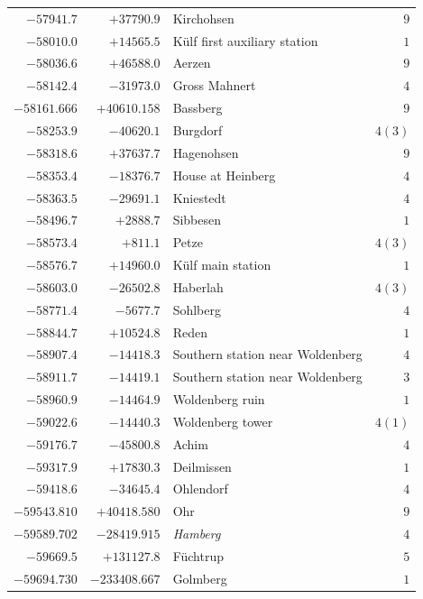 \begin{center}
\begin{tabular}{r|r|p{170pt}|r}
\(-57941.7\)&\(+37790.9\)&Kirchohsen&\(9\)\\
\(-58010.0\)&\(+14565.5\)&Külf first auxiliary station&\(1\)\\
\(-58036.6\)&\(+46588.0\)&Aerzen&\(9\)\\
\(-58142.4\)&\(-31973.0\)&Gross Mahnert&\(4\)\\
\(-58161.666\)&\(+40610.158\)&Bassberg&\(9\)\\
\(-58253.9\)&\(-40620.1\)&Burgdorf&\(4 (3)\)\\
\(-58318.6\)&\(+37637.7\)&Hagenohsen&\(9\)\\
\(-58353.4\)&\(-18376.7\)&House at Heinberg&\(4\)\\
\(-58363.5\)&\(-29691.1\)&Kniestedt&\(4\)\\
\(-58496.7\)&\(+2888.7\)&Sibbesen&\(1\)\\
\(-58573.4\)&\(+811.1\)&Petze&\(4 (3)\)\\
\(-58576.7\)&\(+14960.0\)&Külf main station&\(1\)\\
\(-58603.0\)&\(-26502.8\)&Haberlah&\(4 (3)\)\\
\(-58771.4\)&\(-5677.7\)&Sohlberg&\(4\)\\
\(-58844.7\)&\(+10524.8\)&Reden&\(1\)\\
\(-58907.4\)&\(-14418.3\)&Southern station near Woldenberg\hfill\smash{\raisebox{-4.5pt}{\(\Bigg\}\)}}&\(4\)\\
\(-58911.7\)&\(-14419.1\)&Southern station near Woldenberg&\(3\)\\
\(-58960.9\)&\(-14464.9\)&Woldenberg ruin&\(1\)\\
\(-59022.6\)&\(-14440.3\)&Woldenberg tower&\(4 (1)\)\\
\(-59176.7\)&\(-45800.8\)&Achim&\(4\)\\
\(-59317.9\)&\(+17830.3\)&Deilmissen&\(1\)\\
\(-59418.6\)&\(-34645.4\)&Ohlendorf&\(4\)\\
\(-59543.810\)&\(+40418.580\)&Ohr&\(9\)\\
\(-59589.702\)&\(-28419.915\)&\textit{Hamberg}&\(4\)\\
\(-59669.5\)&\(+131127.8\)&Füchtrup&\(5\)\\
\(-59694.730\)&\(-233408.667\)&Golmberg&\(1\)\\
\hline\end{tabular}\endgroup\end{center}
\clearpage
